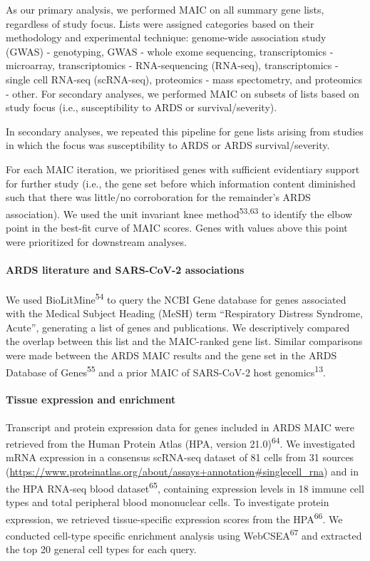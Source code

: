 \documentclass[
  11,
  a4paper,
]{article}
\let\oldparagraph\paragraph
\renewcommand{\paragraph}[1]{\oldparagraph{#1}\mbox{}}
\begin{document}
As our primary analysis, we performed MAIC on all summary gene lists,
regardless of study focus. Lists were assigned categories based on their
methodology and experimental technique: genome-wide association study
(GWAS) - genotyping, GWAS - whole exome sequencing, transcriptomics -
microarray, transcriptomics - RNA-sequencing (RNA-seq), transcriptomics
- single cell RNA-seq (scRNA-seq), proteomics - mass spectometry, and
proteomics - other. For secondary analyses, we performed MAIC on subsets
of lists based on study focus (i.e., susceptibility to ARDS or
survival/severity).

In secondary analyses, we repeated this pipeline for gene lists arising
from studies in which the focus was susceptibility to ARDS or ARDS
survival/severity.

For each MAIC iteration, we prioritised genes with sufficient
evidentiary support for further study (i.e., the gene set before which
information content diminished such that there was little/no
corroboration for the remainder's ARDS association). We used the unit
invariant knee method\textsuperscript{53,63} to identify the elbow point
in the best-fit curve of MAIC scores. Genes with values above this point
were prioritized for downstream analyses.

\hypertarget{ards-literature-and-sars-cov-2-associations}{%
\paragraph{ARDS literature and SARS-CoV-2
associations}\label{ards-literature-and-sars-cov-2-associations}}

We used BioLitMine\textsuperscript{54} to query the NCBI Gene database
for genes associated with the Medical Subject Heading (MeSH) term
``Respiratory Distress Syndrome, Acute'', generating a list of genes and
publications. We descriptively compared the overlap between this list
and the MAIC-ranked gene list. Similar comparisons were made between the
ARDS MAIC results and the gene set in the ARDS Database of
Genes\textsuperscript{55} and a prior MAIC of SARS-CoV-2 host
genomics\textsuperscript{13}.

\hypertarget{tissue-expression-and-enrichment}{%
\paragraph{Tissue expression and
enrichment}\label{tissue-expression-and-enrichment}}

Transcript and protein expression data for genes included in ARDS MAIC
were retrieved from the Human Protein Atlas (HPA, version
21.0)\textsuperscript{64}. We investigated mRNA expression in a
consensus scRNA-seq dataset of 81 cells from 31 sources
(\url{https://www.proteinatlas.org/about/assays+annotation\#singlecell_rna})
and in the HPA RNA-seq blood dataset\textsuperscript{65}, containing
expression levels in 18 immune cell types and total peripheral blood
mononuclear cells. To investigate protein expression, we retrieved
tissue-specific expression scores from the HPA\textsuperscript{66}. We
conducted cell-type specific enrichment analysis using
WebCSEA\textsuperscript{67} and extracted the top 20 general cell types
for each query.
\end{document}
